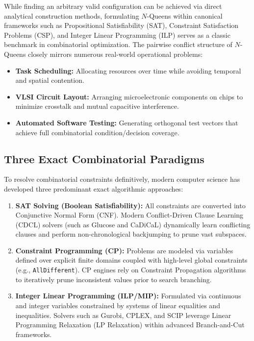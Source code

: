 \documentclass[a4paper,11pt]{article}
\begin{document}
While finding an arbitrary valid configuration can be achieved via direct analytical construction methods, formulating $N$-Queens within canonical frameworks such as Propositional Satisfiability (SAT), Constraint Satisfaction Problems (CSP), and Integer Linear Programming (ILP) serves as a classic benchmark in combinatorial optimization. The pairwise conflict structure of $N$-Queens closely mirrors numerous real-world operational problems:
\begin{itemize}
    \item \textbf{Task Scheduling:} Allocating resources over time while avoiding temporal and spatial contention.
    \item \textbf{VLSI Circuit Layout:} Arranging microelectronic components on chips to minimize crosstalk and mutual capacitive interference.
    \item \textbf{Automated Software Testing:} Generating orthogonal test vectors that achieve full combinatorial condition/decision coverage.
\end{itemize}

\subsection{Three Exact Combinatorial Paradigms}
To resolve combinatorial constraints definitively, modern computer science has developed three predominant exact algorithmic approaches:
\begin{enumerate}
    \item \textbf{SAT Solving (Boolean Satisfiability):} All constraints are converted into Conjunctive Normal Form (CNF). Modern Conflict-Driven Clause Learning (CDCL) solvers (such as Glucose and CaDiCaL) dynamically learn conflicting clauses and perform non-chronological backjumping to prune vast subspaces.
    \item \textbf{Constraint Programming (CP):} Problems are modeled via variables defined over explicit finite domains coupled with high-level global constraints (e.g., \texttt{AllDifferent}). CP engines rely on Constraint Propagation algorithms to iteratively prune inconsistent values prior to search branching.
    \item \textbf{Integer Linear Programming (ILP/MIP):} Formulated via continuous and integer variables constrained by systems of linear equalities and inequalities. Solvers such as Gurobi, CPLEX, and SCIP leverage Linear Programming Relaxation (LP Relaxation) within advanced Branch-and-Cut frameworks.
\end{enumerate}
\end{document}
